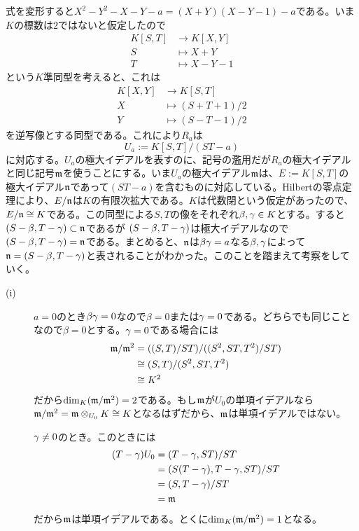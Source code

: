 \begin{sol}
  式を変形すると$X^2 - Y^2 - X - Y -a = (X+Y)(X-Y-1)-a$である。いま$K$の標数は$2$ではないと仮定したので
  \begin{align*}
    K[S,T] &\to K[X,Y] \\
    S &\mapsto X+Y \\
    T &\mapsto X- Y-1
  \end{align*}
  という$K$準同型を考えると、これは
  \begin{align*}
    K[X,Y] &\to K[S,T] \\
    X &\mapsto (S+T+1)/2 \\
    Y &\mapsto (S-T-1)/2
  \end{align*}
  を逆写像とする同型である。これにより$R_a$は
  \[
U_a := K[S,T]/(ST-a)
  \]
  に対応する。$U_a$の極大イデアルを表すのに、記号の濫用だが$R_a$の極大イデアルと同じ記号$\mathfrak{m}$を使うことにする。いま$U_a$の極大イデアル$\mathfrak{m}$は、$E:=K[S,T]$の極大イデアル$\mathfrak{n}$であって$(ST-a)$を含むものに対応している。Hilbertの零点定理により、$E/\mathfrak{n}$は$K$の有限次拡大である。$K$は代数閉という仮定があったので、$E/\mathfrak{n} \cong K$である。この同型による$S,T$の像をそれぞれ$\beta, {\gamma} \in K$とする。すると$(S-\beta,T-{\gamma}) \subset \mathfrak{n}$であるが
  $(S-\beta,T-{\gamma})$は極大イデアルなので
  $(S-\beta,T-{\gamma})=\mathfrak{n}$である。まとめると、$\mathfrak{n}$は$\beta {\gamma} = a$なる$\beta,{\gamma}$によって$\mathfrak{n} = (S-\beta,T-{\gamma})$と表されることがわかった。このことを踏まえて考察をしていく。

  \begin{description}
    \item[(i)] $a=0$のとき$\beta {\gamma}=0$なので$\beta=0$または${\gamma}=0$である。どちらでも同じことなので$\beta=0$とする。${\gamma} =0$である場合には
    \begin{align*}
      \mathfrak{m}/\mathfrak{m}^2 &= ((S,T)/ST ) / ( (S^2,ST,T^2)/ST) \\
      &\cong (S,T)/ (S^2,ST,T^2) \\
      &\cong K^2
    \end{align*}
    だから$\dim_K(\mathfrak{m} /\mathfrak{m}^2) = 2$である。もし$\mathfrak{m}$が$U_0$の単項イデアルなら$\mathfrak{m}/\mathfrak{m}^2 = \mathfrak{m} \otimes_{U_0} K \cong K$となるはずだから、$\mathfrak{m}$は単項イデアルではない。

    ${\gamma} \neq 0$のとき。このときには
    \begin{align*}
      (T-{\gamma})U_0 &= (T-{\gamma},ST)/ST \\
      &= (S(T-{\gamma}),T-{\gamma},ST)/ST \\
      &= (S,T-{\gamma})/ST \\
      &= \mathfrak{m}
    \end{align*}
    だから$\mathfrak{m}$は単項イデアルである。とくに$\dim_K(\mathfrak{m}/\mathfrak{m}^2)=1$となる。


\end{description}
\end{sol}
